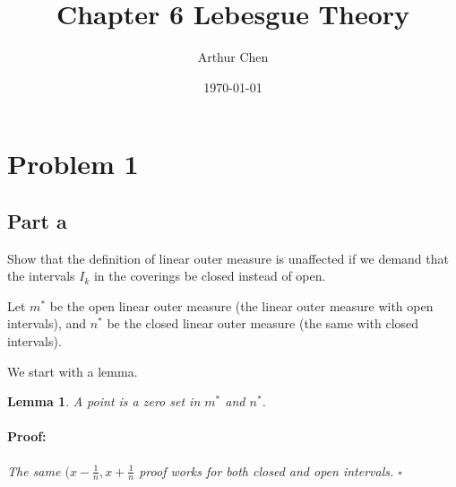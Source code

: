 \documentclass{article}
\author{Arthur Chen}
\title{Chapter 6 Lebesgue Theory}
\date{\today}
\newenvironment{proof}{\paragraph{Proof:}}{\hfill$\square$}
\newtheorem{lemma}[theorem]{Lemma}
\begin{document}
\maketitle

\section*{Problem 1}

\subsection*{Part a}

Show that the definition of linear outer measure is unaffected if we demand that the intervals $I_k$ in the coverings be closed instead of open.

Let $m^*$ be the open linear outer measure (the linear outer measure with open intervals), and $n^*$ be the closed linear outer measure (the same with closed intervals).

We start with a lemma.

\begin{lemma}
A point is a zero set in $m^*$ and $n^*$.
\begin{proof}
The same $(x - \frac{1}{n}, x + \frac{1}{n}$ proof works for both closed and open intervals.
\end{proof}
\end{lemma}
\end{document}
